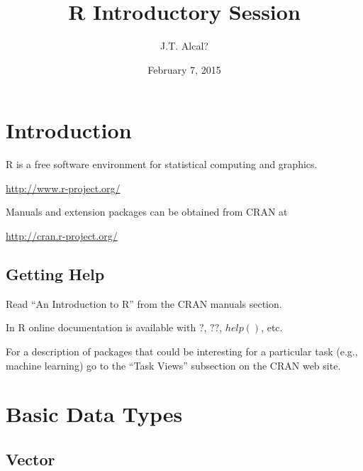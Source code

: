 \documentclass[fleqn, letter, 10pt]{article}
\begin{document}


\title{R Introductory Session}
\author{J.T. Alcal?}
\date{February 7, 2015}
\maketitle
\tableofcontents
\sloppy






\section{Introduction}

R is a free software environment for statistical computing and graphics.

\url{http://www.r-project.org/}

Manuals and extension packages can be obtained from CRAN at

\url{http://cran.r-project.org/}

\subsection{Getting Help}

Read ``An Introduction to R'' from the CRAN manuals section.

In R online documentation is available with $?$, $??$, $help()$, etc.

For a description of packages that could be interesting for a particular 
task  (e.g., machine learning) 
go to the ``Task Views'' subsection on the CRAN web site.

\section{Basic Data Types}
\subsection{Vector}
\end{document}
